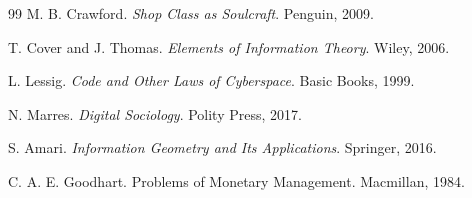 \documentclass[12pt]{article}
\begin{document}
\begin{thebibliography}{99}
M. B. Crawford.
\newblock \emph{Shop Class as Soulcraft}.
\newblock Penguin, 2009.

T. Cover and J. Thomas.
\newblock \emph{Elements of Information Theory}.
\newblock Wiley, 2006.

L. Lessig.
\newblock \emph{Code and Other Laws of Cyberspace}.
\newblock Basic Books, 1999.

N. Marres.
\newblock \emph{Digital Sociology}.
\newblock Polity Press, 2017.

S. Amari.
\newblock \emph{Information Geometry and Its Applications}.
\newblock Springer, 2016.

C. A. E. Goodhart.
\newblock Problems of Monetary Management.
\newblock Macmillan, 1984.

\end{thebibliography}
\end{document}
